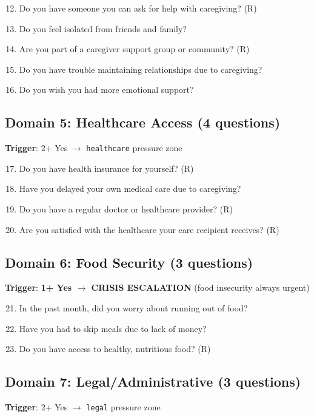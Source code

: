 \documentclass{article}
\begin{document}
\begin{enumerate}
    \setcounter{enumi}{11}
    \item Do you have someone you can ask for help with caregiving? (R)
    \item Do you feel isolated from friends and family?
    \item Are you part of a caregiver support group or community? (R)
    \item Do you have trouble maintaining relationships due to caregiving?
    \item Do you wish you had more emotional support?
\end{enumerate}

\subsection*{Domain 5: Healthcare Access (4 questions)}
\textbf{Trigger}: 2+ Yes $\rightarrow$ \texttt{healthcare} pressure zone

\begin{enumerate}
    \setcounter{enumi}{16}
    \item Do you have health insurance for yourself? (R)
    \item Have you delayed your own medical care due to caregiving?
    \item Do you have a regular doctor or healthcare provider? (R)
    \item Are you satisfied with the healthcare your care recipient receives? (R)
\end{enumerate}

\subsection*{Domain 6: Food Security (3 questions)}
\textbf{Trigger}: \textbf{1+ Yes $\rightarrow$ CRISIS ESCALATION} (food insecurity always urgent)

\begin{enumerate}
    \setcounter{enumi}{20}
    \item In the past month, did you worry about running out of food?
    \item Have you had to skip meals due to lack of money?
    \item Do you have access to healthy, nutritious food? (R)
\end{enumerate}

\subsection*{Domain 7: Legal/Administrative (3 questions)}
\textbf{Trigger}: 2+ Yes $\rightarrow$ \texttt{legal} pressure zone
\end{document}
